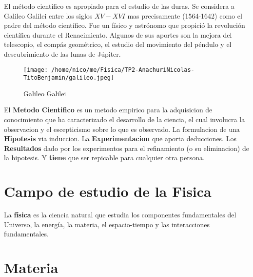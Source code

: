 \documentclass[11pt]{article}
\begin{document}
El método cientifico es apropiado para el estudio de las \gls{duras}. Se considera a Galileo Galilei entre los siglos $XV - XVI$ mas precisamente (1564-1642) como el padre del método científico. Fue un físico y astrónomo que propició la revolución científica durante el Renacimiento. Algunos de sus aportes son la mejora del telescopio, el compás geométrico, el estudio del movimiento del péndulo y el descubrimiento de las lunas de Júpiter.

\begin{wrapfigure}{l}{0.6\linewidth}

  \centering
  \texttt{[image: /home/nico/me/Fisica/TP2-AnachuriNicolas-TitoBenjamin/galileo.jpeg]}
  \caption{Galileo Galilei}
  \label{fig:etiqueta}

\end{wrapfigure}

El \textbf{Metodo Cientifico} \cite{historia} es un metodo \gls{empirico} para la adquisicion de conocimiento que ha caracterizado  el desarrollo de la ciencia, el cual involucra la observacion y el escepticismo sobre lo que es observado. La formulacion de una \textbf{Hipotesis} via induccion. La \textbf{Experimentacion} que aporta deducciones. Los \textbf{Resultados} dado por los experimentos para el refinamiento (o su eliminacion) de la hipotesis. Y \textbf{tiene} que ser repicable para cualquier otra persona.


\section{Campo de estudio de la Fisica}

La \textbf{física} es la ciencia natural que estudia los componentes fundamentales del Universo, la energía, la materia, el espacio-tiempo y las interacciones fundamentales.

\section{Materia}
\end{document}
